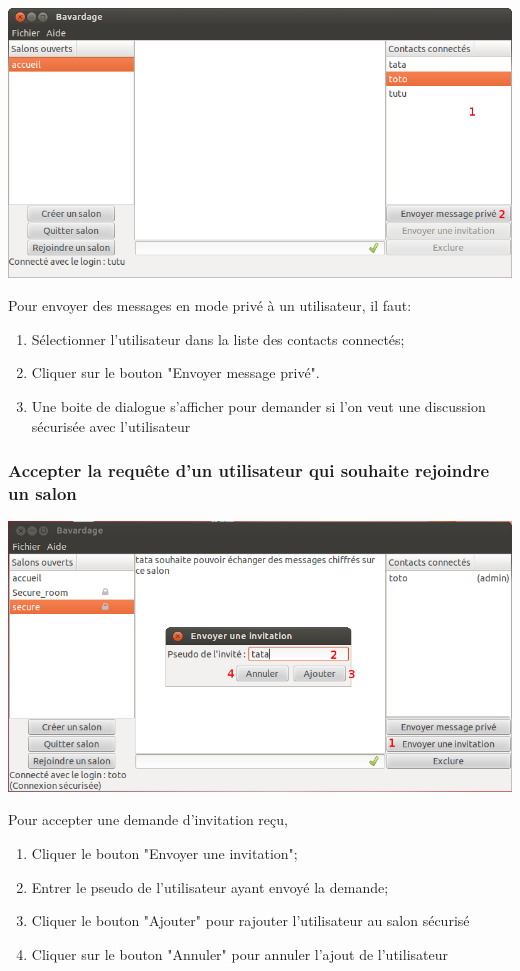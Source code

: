 \documentclass[a4paper,11pt,french]{book}
\begin{document}
\includegraphics[width=40em]{capture/mp_nsec.png}

Pour envoyer des messages en mode privé à un utilisateur, il faut:

\begin{enumerate}
    \item Sélectionner l'utilisateur dans la liste des contacts connectés;
    \item Cliquer sur le bouton "Envoyer message privé".
    \item Une boite de dialogue s'afficher pour demander si l'on veut une discussion sécurisée avec l'utilisateur 
\end{enumerate}

\subsubsection{Accepter la requête d'un utilisateur qui souhaite rejoindre un salon}

\includegraphics[width=40em]{capture/invit_room.png}

Pour accepter une demande d'invitation reçu,
\begin{enumerate}
    \item Cliquer le bouton "Envoyer une invitation";
    \item Entrer le pseudo de l'utilisateur ayant envoyé la demande;
    \item Cliquer le bouton "Ajouter" pour rajouter l'utilisateur au salon sécurisé
    \item Cliquer sur le bouton "Annuler" pour annuler l'ajout de l'utilisateur
\end{enumerate}
\end{document}
